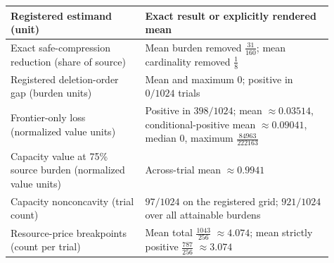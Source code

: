 \begin{tabular}{@{}>{\raggedright\arraybackslash}p{0.38\linewidth}>{\raggedright\arraybackslash}p{0.53\linewidth}@{}}
\toprule
Registered estimand (unit) & Exact result or explicitly rendered mean \\
\midrule
Exact safe-compression reduction (share of source) & Mean burden removed \(\frac{31}{160}\); mean cardinality removed \(\frac{1}{8}\) \\
Registered deletion-order gap (burden units) & Mean and maximum \(0\); positive in \(0/1024\) trials \\
Frontier-only loss (normalized value units) & Positive in \(398/1024\); mean \(\approx0.03514\), conditional-positive mean \(\approx0.09041\), median \(0\), maximum \(\frac{84963}{222163}\) \\
Capacity value at 75\% source burden (normalized value units) & Across-trial mean \(\approx0.9941\) \\
Capacity nonconcavity (trial count) & \(97/1024\) on the registered grid; \(921/1024\) over all attainable burdens \\
Resource-price breakpoints (count per trial) & Mean total \(\frac{1043}{256}\) \(\approx4.074\); mean strictly positive \(\frac{787}{256}\) \(\approx3.074\) \\
\bottomrule
\end{tabular}
